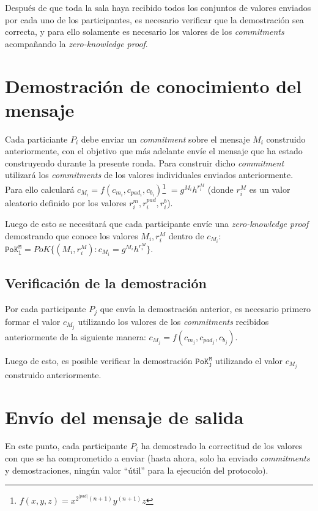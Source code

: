 Después de que toda la sala haya recibido todos los conjuntos de valores enviados 
por cada uno de los participantes, es necesario verificar que la demostración sea 
correcta, y para ello solamente es necesario los valores de los \emph{commitments} 
acompañando la \emph{zero-knowledge proof}.

\section{Demostración de conocimiento del mensaje}

Cada particiante $P_i$ debe enviar un \emph{commitment} sobre el mensaje $M_i$ 
construido anteriormente, con el objetivo que más adelante envíe el mensaje que 
ha estado construyendo durante la presente ronda. Para construir dicho \emph{commitment} 
utilizará los \emph{commitments} de los valores individuales enviados anteriormente. 
Para ello calculará 
$c_{M_i} = f(c_{m_i}, c_{pad_i}, c_{b_i})$\footnote{$f(x, y, z) = x^{2^{|pad|}(n+1)} y^{(n+1)} z$} 
$= g^{M_i} h^{r_i^{M}}$ (donde $r_i^{M}$ es un valor aleatorio definido por los 
valores $r_i^m, r_i^{pad}, r_i^b$). 

Luego de esto se necesitará que cada participante envíe una \emph{zero-knowledge proof} 
demostrando que conoce los valores $M_i, r_i^M$ dentro de $c_{M_i}$: 
$\mathtt{PoK_i^M} = PoK\{(M_i, r_i^M) : c_{M_i} = g^{M_i} h^{r_i^M}\}$.

\subsection{Verificación de la demostración}

Por cada participante $P_j$ que envía la demostración anterior, es necesario primero 
formar el valor $c_{M_j}$ utilizando los valores de los \emph{commitments} recibidos 
anteriormente de la siguiente manera: $c_{M_j} = f(c_{m_j}, c_{pad_j}, c_{b_j})$.

Luego de esto, es posible verificar la demostración $\mathtt{PoK_j^M}$ utilizando el 
valor $c_{M_j}$ construido anteriormente.

\section{Envío del mensaje de salida}

En este punto, cada participante $P_i$ ha demostrado la correctitud de los valores 
con que se ha comprometido a enviar (hasta ahora, solo ha enviado \emph{commitments} 
y demostraciones, ningún valor ``útil'' para la ejecución del protocolo).

